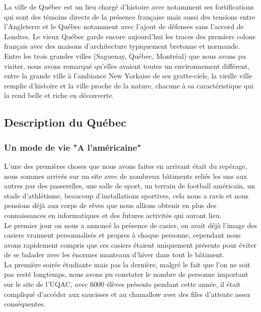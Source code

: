La ville de Québec est un lieu chargé d’histoire avec notamment ses fortifications qui sont des témoins directs de la présence française mais aussi des tensions entre l’Angleterre et le Québec notamment avec l’ajout de défenses sans l’accord de Londres. Le vieux Québec garde encore aujourd’hui les traces des premiers colons français avec des maisons d’architecture typiquement bretonne et normande.\\

Entre les trois grandes villes (Saguenay, Québec, Montréal) que nous avons pu visiter, nous avons remarqué qu'elles avaient toutes un environnement différent, entre la grande ville à l'ambiance New Yorkaise de ses gratte-ciels, la vieille ville remplie d'histoire et la ville proche de la nature, chacune à sa caractéristique qui la rend belle et riche en découverte.

\subsection{Description du Québec}

    \subsubsection{Un mode de vie "A l'américaine"}

L’une des premières choses que nous avons faites en arrivant était du repérage, nous sommes arrivés sur un site avec de nombreux bâtiments reliés les uns aux autres par des passerelles, une salle de sport, un terrain de football américain, un stade d’athlétisme, beaucoup d’installations sportives, cela nous a ravis et nous pensions déjà aux corps de rêves que nous allions obtenir en plus des connaissances en informatiques et des futures activités qui auront lieu.\\

Le premier jour on nous a annoncé la présence de casier, on avait déjà l’image des casiers vraiment personnalisés et propres à chaque personne, cependant nous avons rapidement compris que ces casiers étaient uniquement présents pour éviter de se balader avec les énormes manteaux d’hiver dans tout le bâtiment.\\

La première soirée étudiante mais pas la dernière, malgré le fait que l'on ne soit pas resté longtemps, nous avons pu constater le nombre de personne important sur le site de l’UQAC, avec 6000 élèves présents pendant cette année, il était compliqué d’accéder aux saucisses et au chamallow avec des files d’attente assez conséquentes.\\

